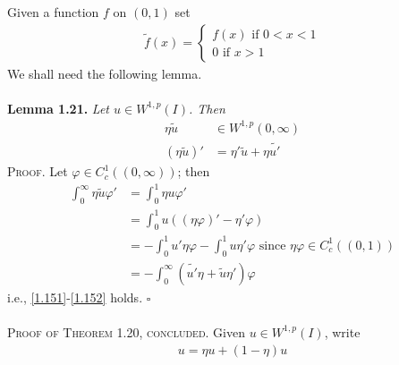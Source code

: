 \documentclass[a4paper,oneside]{article}
\numberwithin{equation}{section}
\begin{document}
Given a function $f$ on $\left(0,1\right)$ set
\begin{align}
\label{1.151}
\tilde f\left( x \right) = \left\{ {\begin{array}{*{20}{c}}
{f\left( x \right)\mbox{ if } 0 < x < 1}\\
{0\mbox{ if } x > 1}
\end{array}} \right.
\end{align}
We shall need the following lemma.\\
\\
\textbf{Lemma 1.21.} \textit{Let $u \in W^{1,p}\left(I\right)$. Then}
\begin{align}
\label{1.151}
\eta \tilde u &\in {W^{1,p}}\left( {0,\infty } \right)\\
\left( {\eta \tilde u} \right)' &= \eta '\tilde u + \eta \widetilde {u'} \label{1.152}
\end{align}
\textsc{Proof.} Let $\varphi  \in C_c^1\left( {\left( {0,\infty } \right)} \right)$; then
\begin{align}
\int_0^\infty  {\eta \tilde u\varphi '}  &= \int_0^1 {\eta u\varphi '} \\
& = \int_0^1 {u\left( {\left( {\eta \varphi } \right)' - \eta '\varphi } \right)} \\
& =  - \int_0^1 {u'\eta \varphi }  - \int_0^1 {u\eta '\varphi } \mbox{ since } \eta \varphi \in C_c^1\left( {\left( {0,1} \right)} \right)\\
& =  - \int_0^\infty  {\left( {\widetilde {u'}\eta  + \tilde u\eta '} \right)\varphi } 
\end{align}
i.e., \eqref{1.151}-\eqref{1.152} holds. \hfill $\square$\\
\\
\textsc{Proof of Theorem 1.20, concluded.} Given $u\in W^{1,p}\left(I\right)$, write
\begin{align}
u = \eta u + \left( {1 - \eta } \right)u
\end{align}
\end{document}
